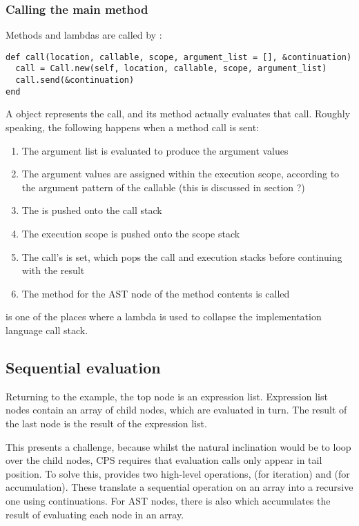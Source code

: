 \subsubsection{Calling the main method}

Methods and lambdas are called by :

\begin{lstlisting}
def call(location, callable, scope, argument_list = [], &continuation)
  call = Call.new(self, location, callable, scope, argument_list)
  call.send(&continuation)
end
\end{lstlisting}

A  object represents the call, and its  method actually evaluates that call. Roughly speaking, the following happens when a method call is sent:

\begin{enumerate}
  \item The argument list is evaluated to produce the argument values
  \item The argument values are assigned within the execution scope, according to the argument pattern of the callable (this is discussed in section ?)
  \item The  is pushed onto the call stack
  \item The execution scope is pushed onto the scope stack
  \item The call's  is set, which pops the call and execution stacks before continuing with the result
  \item The  method for the AST node of the method contents is called
\end{enumerate}

 is one of the places where a lambda is used to collapse the implementation language call stack.

\subsection{Sequential evaluation}

Returning to the example, the top node is an expression list. Expression list nodes contain an array of child nodes, which are evaluated in turn. The result of the last node is the result of the expression list.

This presents a challenge, because whilst the natural inclination would be to loop over the child nodes, CPS requires that evaluation calls only appear in tail position. To solve this,  provides two high-level operations,  (for iteration) and  (for accumulation). These translate a sequential operation on an array into a recursive one using continuations. For AST nodes, there is also  which accumulates the result of evaluating each node in an array.

